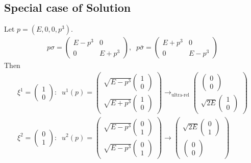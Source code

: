 \documentclass[]{scrartcl}
\begin{document}
\subsection{Special case of Solution}
Let $p = (E,0,0,p^3).$
\begin{gather}
	p\sigma = 
	\begin{pmatrix}
		E-p^3 & 0 \\ 0 & E+p^3
	\end{pmatrix},\;\; p\bar\sigma =
	\begin{pmatrix}
		E + p^3 & 0 \\ 0 & E-p^3
	\end{pmatrix}
\end{gather}
Then
\begin{gather}
	\xi^1 =
	\begin{pmatrix}
		1 \\ 0
	\end{pmatrix}:\;\;
	u^1(p) =
	\begin{pmatrix}
		\sqrt{E-p^3} 
		\begin{pmatrix}
			1 \\ 0
		\end{pmatrix}\\
		\sqrt{E + p^3} 
		\begin{pmatrix}
			1 \\ 0
		\end{pmatrix}
	\end{pmatrix}
	\rightarrow_{\text{ultra-rel}}
	\begin{pmatrix}
		\begin{pmatrix}
			0 \\ 0
		\end{pmatrix}
		\\
		\sqrt{2E}
		\begin{pmatrix}
			1 \\ 0
		\end{pmatrix}
	\end{pmatrix}
	\\
	\xi^2 = 
	\begin{pmatrix}
		0 \\ 1
	\end{pmatrix}:\;\;
	u^2(p) =
	\begin{pmatrix}
		\sqrt{E-p^3}
		\begin{pmatrix}
			0 \\ 1
		\end{pmatrix}
		\\
		\sqrt{E-p^3}
		\begin{pmatrix}
			0 \\ 1
		\end{pmatrix}
	\end{pmatrix}
		\rightarrow
		\begin{pmatrix}
			\sqrt{2E}
			\begin{pmatrix}
				0 \\ 1
			\end{pmatrix}\\
			\begin{pmatrix}
				0 \\ 0
			\end{pmatrix}
		\end{pmatrix}
\end{gather}
\end{document}
